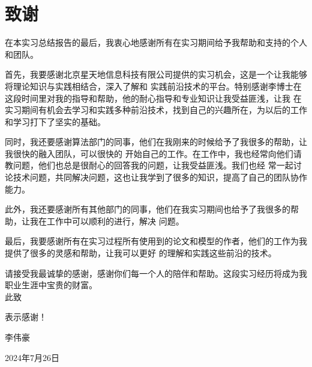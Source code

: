 \documentclass{nwputhesis}
\begin{document}
\makespace
\section*{致谢}
在本实习总结报告的最后，我衷心地感谢所有在实习期间给予我帮助和支持的个人和团队。

首先，我要感谢北京星天地信息科技有限公司提供的实习机会，这是一个让我能够将理论知识与实践相结合，深入了解和
实践前沿技术的平台。特别感谢李博士在这段时间里对我的指导和帮助，他的耐心指导和专业知识让我受益匪浅，让我
在实习期间有机会去学习和实践多种前沿技术，找到自己的兴趣所在，为以后的工作和学习打下了坚实的基础。

同时，我还要感谢算法部门的同事，他们在我刚来的时候给予了我很多的帮助，让我很快的融入团队，可以很快的
开始自己的工作。在工作中，我也经常向他们请教问题，他们也总是很耐心的回答我的问题，让我受益匪浅。我们也经
常一起讨论技术问题，共同解决问题，这也让我学到了很多的知识，提高了自己的团队协作能力。

此外，我还要感谢所有其他部门的同事，他们在我实习期间也给予了我很多的帮助，让我在工作中可以顺利的进行，解决
问题。

最后，我要感谢所有在实习过程所有使用到的论文和模型的作者，他们的工作为我提供了很多的灵感和帮助，让我可以更好
的理解和实践这些前沿的技术。

请接受我最诚挚的感谢，感谢你们每一个人的陪伴和帮助。这段实习经历将成为我职业生涯中宝贵的财富。
\\

\noindent 此致

\noindent 表示感谢！

\noindent 李伟豪

\noindent 2024年7月26日

\makespace
\end{document}
